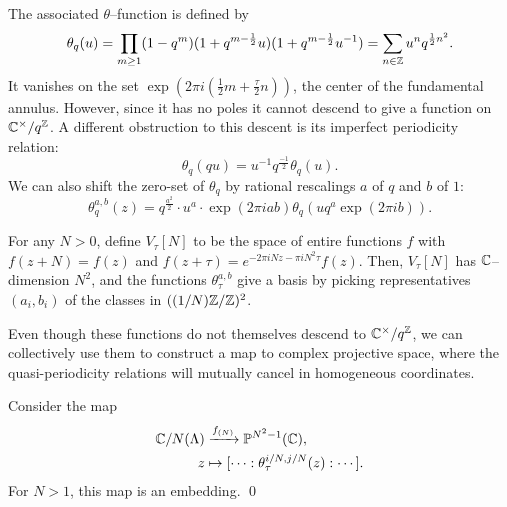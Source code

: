The associated $\theta$--function is defined by \[\theta_q(u) = \prod_{m \ge 1} (1 - q^m) (1 + q^{m-\frac{1}{2}}u) (1 + q^{m-\frac{1}{2}}u^{-1}) = \sum_{n \in \mathbb Z} u^n q^{\frac{1}{2} n^2}.\]  It vanishes on the set $\exp(2 \pi i (\frac{1}{2}m + \frac{\tau}{2}n))$, the center of the fundamental annulus.  However, since it has no poles it cannot descend to give a function on $\mathbb{C}^\times / q^{\mathbb Z}$.  A different obstruction to this descent is its imperfect periodicity relation: \[\theta_q(qu) = u^{-1} q^{\frac{-1}{2}} \theta_q(u).\]  We can also shift the zero-set of $\theta_q$ by rational rescalings $a$ of $q$ and $b$ of $1$: \[\theta_q^{a,b}(z) = q^{\frac{a^2}{2}} \cdot u^a \cdot \exp(2 \pi i a b) \theta_q(u q^a \exp(2 \pi i b)).\]

\begin{remark}
For any $N > 0$, define $V_\tau[N]$ to be the space of entire functions $f$ with $f(z + N) = f(z)$ and $f(z + \tau) = e^{-2 \pi i N z - \pi i N^2 \tau} f(z)$.  Then, $V_\tau[N]$ has $\mathbb{C}$--dimension $N^2$, and the functions $\theta_\tau^{a, b}$ give a basis by picking representatives $(a_i, b_i)$ of the classes in $((1/N)\mathbb Z / \mathbb Z)^2$.
\end{remark}

Even though these functions do not themselves descend to $\mathbb{C}^\times / q^{\mathbb Z}$, we can collectively use them to construct a map to complex projective space, where the quasi-periodicity relations will mutually cancel in homogeneous coordinates.
\begin{theorem}
Consider the map
\begin{align*}
\mathbb{C} / N(\Lambda) & \xrightarrow{f_{(N)}} \mathbb{P}^{N^2-1}(\mathbb{C}), \\
z & \mapsto [\cdots : \theta_\tau^{i/N, j/N}(z) : \cdots].
\end{align*}
For $N > 1$, this map is an embedding. \qed
\end{theorem}

